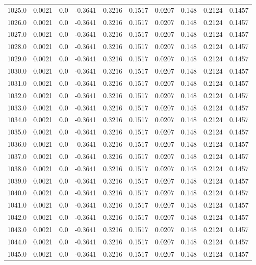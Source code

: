 \begin{longtable}{lrrrrrrrrr}
1025.0 & 0.0021 & 0.0 & -0.3641 & 0.3216 & 0.1517 & 0.0207 & 0.148 & 0.2124 & 0.1457 \\
1026.0 & 0.0021 & 0.0 & -0.3641 & 0.3216 & 0.1517 & 0.0207 & 0.148 & 0.2124 & 0.1457 \\
1027.0 & 0.0021 & 0.0 & -0.3641 & 0.3216 & 0.1517 & 0.0207 & 0.148 & 0.2124 & 0.1457 \\
1028.0 & 0.0021 & 0.0 & -0.3641 & 0.3216 & 0.1517 & 0.0207 & 0.148 & 0.2124 & 0.1457 \\
1029.0 & 0.0021 & 0.0 & -0.3641 & 0.3216 & 0.1517 & 0.0207 & 0.148 & 0.2124 & 0.1457 \\
1030.0 & 0.0021 & 0.0 & -0.3641 & 0.3216 & 0.1517 & 0.0207 & 0.148 & 0.2124 & 0.1457 \\
1031.0 & 0.0021 & 0.0 & -0.3641 & 0.3216 & 0.1517 & 0.0207 & 0.148 & 0.2124 & 0.1457 \\
1032.0 & 0.0021 & 0.0 & -0.3641 & 0.3216 & 0.1517 & 0.0207 & 0.148 & 0.2124 & 0.1457 \\
1033.0 & 0.0021 & 0.0 & -0.3641 & 0.3216 & 0.1517 & 0.0207 & 0.148 & 0.2124 & 0.1457 \\
1034.0 & 0.0021 & 0.0 & -0.3641 & 0.3216 & 0.1517 & 0.0207 & 0.148 & 0.2124 & 0.1457 \\
1035.0 & 0.0021 & 0.0 & -0.3641 & 0.3216 & 0.1517 & 0.0207 & 0.148 & 0.2124 & 0.1457 \\
1036.0 & 0.0021 & 0.0 & -0.3641 & 0.3216 & 0.1517 & 0.0207 & 0.148 & 0.2124 & 0.1457 \\
1037.0 & 0.0021 & 0.0 & -0.3641 & 0.3216 & 0.1517 & 0.0207 & 0.148 & 0.2124 & 0.1457 \\
1038.0 & 0.0021 & 0.0 & -0.3641 & 0.3216 & 0.1517 & 0.0207 & 0.148 & 0.2124 & 0.1457 \\
1039.0 & 0.0021 & 0.0 & -0.3641 & 0.3216 & 0.1517 & 0.0207 & 0.148 & 0.2124 & 0.1457 \\
1040.0 & 0.0021 & 0.0 & -0.3641 & 0.3216 & 0.1517 & 0.0207 & 0.148 & 0.2124 & 0.1457 \\
1041.0 & 0.0021 & 0.0 & -0.3641 & 0.3216 & 0.1517 & 0.0207 & 0.148 & 0.2124 & 0.1457 \\
1042.0 & 0.0021 & 0.0 & -0.3641 & 0.3216 & 0.1517 & 0.0207 & 0.148 & 0.2124 & 0.1457 \\
1043.0 & 0.0021 & 0.0 & -0.3641 & 0.3216 & 0.1517 & 0.0207 & 0.148 & 0.2124 & 0.1457 \\
1044.0 & 0.0021 & 0.0 & -0.3641 & 0.3216 & 0.1517 & 0.0207 & 0.148 & 0.2124 & 0.1457 \\
1045.0 & 0.0021 & 0.0 & -0.3641 & 0.3216 & 0.1517 & 0.0207 & 0.148 & 0.2124 & 0.1457 \\

\end{longtable}
